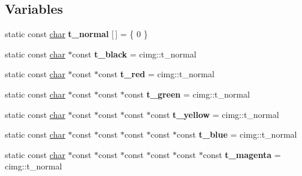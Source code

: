 \subsection*{Variables}
\begin{DoxyCompactItemize}
\item 
\mbox{\label{namespacecimg__library__suffixed_1_1cimg_a4085388d65b8df6a48ab80e1d9433067}} 
static const \hyperlink{classchar}{char} {\bfseries t\+\_\+normal} \mbox{[}$\,$\mbox{]} = \{ 0 \}
\item 
\mbox{\label{namespacecimg__library__suffixed_1_1cimg_ab6b0a29c1bb19d521c07d0c358fcd630}} 
static const \hyperlink{classchar}{char} $\ast$const {\bfseries t\+\_\+black} = cimg\+::t\+\_\+normal
\item 
\mbox{\label{namespacecimg__library__suffixed_1_1cimg_a026c37ed02ac5fa31f8dbc063b954783}} 
static const \hyperlink{classchar}{char} $\ast$const $\ast$const {\bfseries t\+\_\+red} = cimg\+::t\+\_\+normal
\item 
\mbox{\label{namespacecimg__library__suffixed_1_1cimg_a5307c22c2145453f3144204201f5af40}} 
static const \hyperlink{classchar}{char} $\ast$const $\ast$const $\ast$const {\bfseries t\+\_\+green} = cimg\+::t\+\_\+normal
\item 
\mbox{\label{namespacecimg__library__suffixed_1_1cimg_a86e4e47f6ac24dd49583732cee72a619}} 
static const \hyperlink{classchar}{char} $\ast$const $\ast$const $\ast$const $\ast$const {\bfseries t\+\_\+yellow} = cimg\+::t\+\_\+normal
\item 
\mbox{\label{namespacecimg__library__suffixed_1_1cimg_a56dbb01631e580897e76c00f1a157191}} 
static const \hyperlink{classchar}{char} $\ast$const $\ast$const $\ast$const $\ast$const $\ast$const {\bfseries t\+\_\+blue} = cimg\+::t\+\_\+normal
\item 
\mbox{\label{namespacecimg__library__suffixed_1_1cimg_ac9676537eeae4a763961802c7697bac8}} 
static const \hyperlink{classchar}{char} $\ast$const $\ast$const $\ast$const $\ast$const $\ast$const $\ast$const {\bfseries t\+\_\+magenta} = cimg\+::t\+\_\+normal

\end{DoxyCompactItemize}
